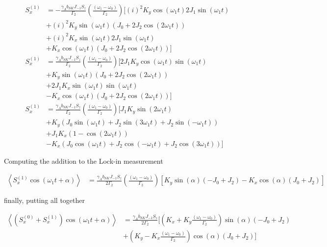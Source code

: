 \documentclass{article}
\begin{document}
\begin{align}
      S_x^{(1)} &= -\frac{\gamma_{A}b_{SK}J_{-1} S_z}{\Gamma_2}\left(\frac{\left(\omega_1 - \omega_0\right)}{\Gamma_2}\right) \Bigg[ (i)^2 K_y\cos{(\omega_1 t)}2 J_{1}\sin{\left(\omega_1 t\right)}\\
      &+ (i)^2 K_y \sin{(\omega_1 t)}\left(J_0+ 2 J_{2}\cos{\left(2\omega_1 t\right)}\right)\\
      &+ (i)^2 K_x \sin{(\omega_1 t)}2 J_{1}\sin{\left(\omega_1 t\right)}\\
      &+ K_x \cos{(\omega_1 t)}\left(J_0+ 2 J_{2}\cos{\left(2\omega_1 t\right)}\right)\Bigg]\\
      S_x^{(1)} &= \frac{\gamma_{A}b_{SK}J_{-1} S_z}{\Gamma_2}\left(\frac{\left(\omega_1 - \omega_0\right)}{\Gamma_2}\right) \Bigg[ 2 J_{1}K_y\cos{(\omega_1 t)}\sin{\left(\omega_1 t\right)}\\
      &+  K_y \sin{(\omega_1 t)}\left(J_0+ 2 J_{2}\cos{\left(2\omega_1 t\right)}\right)\\
      &+  2 J_{1}K_x \sin{(\omega_1 t)}\sin{\left(\omega_1 t\right)}\\
      &- K_x \cos{(\omega_1 t)}\left(J_0+ 2 J_{2}\cos{\left(2\omega_1 t\right)}\right)\Bigg]\\
      S_x^{(1)} &= \frac{\gamma_{A}b_{SK}J_{-1} S_z}{\Gamma_2}\left(\frac{\left(\omega_1 - \omega_0\right)}{\Gamma_2}\right) \Bigg[ J_{1}K_y\sin{(2\omega_1 t)}\\
      &+  K_y \left(J_0\sin{(\omega_1 t)}+ J_{2}\sin{(3\omega_1 t)}+J_{2}\sin{\left(-\omega_1 t\right)}\right)\\
      &+  J_{1}K_x \left(1 - \cos{\left(2\omega_1 t\right)}\right)\\
      &- K_x \left(J_0\cos{(\omega_1 t)}+  J_{2}\cos{(-\omega_1 t)}+ J_{2}\cos{\left(3\omega_1 t\right)}\right)\Bigg]
\end{align}

Computing the addition to the Lock-in measurement

\begin{align}
      \left<S_x^{(1)}\cos{\left(\omega_1 t+\alpha\right)}\right> &= \frac{\gamma_{A}b_{SK}J_{-1} S_z}{2\Gamma_2}\left(\frac{\left(\omega_1 - \omega_0\right)}{\Gamma_2}\right) \left[K_y\sin{(\alpha)} \left(-J_0+J_{2}\right)- K_x \cos{(\alpha)}\left(J_0+  J_{2}\right)\right]
\end{align}

finally, putting all together 

\begin{align}
      \left<\left(S_x^{(0)}+S_x^{(1)}\right)\cos{\left(\omega_1 t+\alpha\right)}\right> &= \frac{\gamma_{A}b_{SK}J_{-1} S_z}{2\Gamma_2} \bigg[\left(K_x + K_y \frac{\left(\omega_1 - \omega_0\right)}{\Gamma_2}\right)\sin{(\alpha)}\left(-J_0+J_{2}\right) \\
      &+ \left(K_y- K_x\frac{\left(\omega_1 - \omega_0\right)}{\Gamma_2}\right) \cos{(\alpha)}\left(J_0+  J_{2}\right)\bigg]\label{eq:lockin_zero_first_order_sx}
\end{align}
\end{document}
